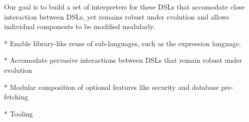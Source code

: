 
Our goal is to build a set of interpreters for these DSLs that accomodate close interaction between DSLs, yet remains robust under evolution and allows individual components to be modified modularly.

* Enable library-like reuse of sub-languages, such as the expression language. 

* Accomodate pervasive interactions between DSLs that remain robust under evolution

* Modular composition of optional features like security and database pre-fetching

* Tooling


